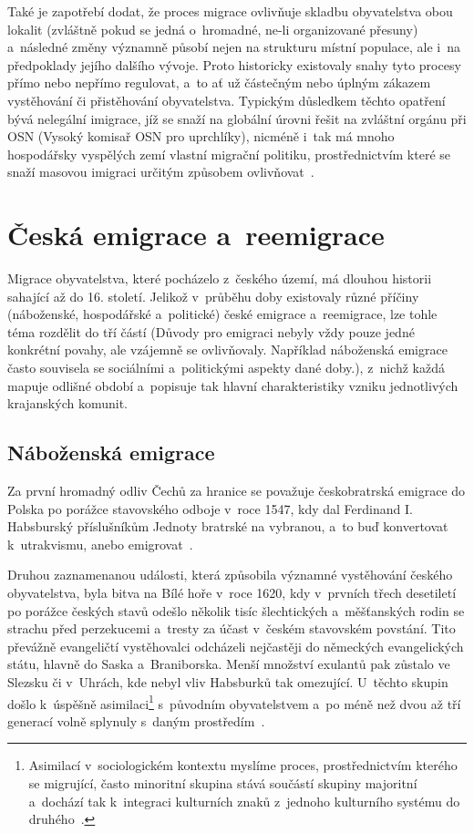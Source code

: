 Také je zapotřebí dodat, že proces migrace ovlivňuje skladbu obyvatelstva obou lokalit (zvláštně pokud se jedná o~hromadné, ne-li organizované přesuny) a~následné změny významně působí nejen na strukturu místní populace, ale i~na předpoklady jejího dalšího vývoje. Proto historicky existovaly snahy tyto procesy přímo nebo nepřímo regulovat, a~to ať už částečným nebo úplným zákazem vystěhování či přistěhování obyvatelstva. Typickým důsledkem těchto opatření bývá nelegální imigrace, jíž se snaží na globální úrovni řešit na zvláštní orgánu při OSN (Vysoký komisař OSN pro uprchlíky), nicméně i~tak má mnoho hospodářsky vyspělých zemí vlastní migrační politiku, prostřednictvím které se snaží masovou imigraci určitým způsobem ovlivňovat~\parencite{Fialova2017a}.

\hypertarget{ux10deskuxe1-emigrace-a-reemigrace}{%
\section{Česká emigrace a~reemigrace}\label{ux10deskuxe1-emigrace-a-reemigrace}}

Migrace obyvatelstva, které pocházelo z~českého území, má dlouhou historii sahající až do 16. století. Jelikož v~průběhu doby existovaly různé příčiny (náboženské, hospodářské a~politické) české emigrace a~reemigrace, lze tohle téma rozdělit do tří částí (Důvody pro emigraci nebyly vždy pouze jedné konkrétní povahy, ale vzájemně se ovlivňovaly. Například náboženská emigrace často souvisela se sociálními a~politickými aspekty dané doby.), z~nichž každá mapuje odlišné období a~popisuje tak hlavní charakteristiky vzniku jednotlivých krajanských komunit.

\hypertarget{nuxe1boux17eenskuxe1-emigrace}{%
\subsection{Náboženská emigrace}\label{nuxe1boux17eenskuxe1-emigrace}}

Za první hromadný odliv Čechů za hranice se považuje českobratrská emigrace do Polska po porážce stavovského odboje v~roce 1547, kdy dal Ferdinand I. Habsburský příslušníkům Jednoty bratrské na vybranou, a~to buď konvertovat k~utrakvismu, anebo emigrovat~\parencite{Vaculik2009a}.

Druhou zaznamenanou události, která způsobila významné vystěhování českého obyvatelstva, byla bitva na Bílé hoře v~roce 1620, kdy v~prvních třech desetiletí po porážce českých stavů odešlo několik tisíc šlechtických a~měšťanských rodin se strachu před perzekucemi a~tresty za účast v~českém stavovském povstání. Tito převážně evangeličtí vystěhovalci odcházeli nejčastěji do německých evangelických státu, hlavně do Saska a~Braniborska. Menší množství exulantů pak zůstalo ve Slezsku či v~Uhrách, kde nebyl vliv Habsburků tak omezující. U~těchto skupin došlo k~úspěšně asimilaci\footnote{Asimilací v~sociologickém kontextu myslíme proces, prostřednictvím kterého se migrující, často minoritní skupina stává součástí skupiny majoritní a~dochází tak k~integraci kulturních znaků z~jednoho kulturního systému do druhého~\parencite{Petrusek2017}.} s~původním obyvatelstvem a~po méně než dvou až tří generací volně splynuly s~daným prostředím~\parencite{Vaculik2002}.

